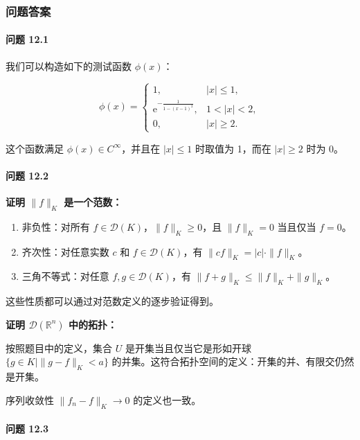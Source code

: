 \subsubsection{问题答案}\label{ux95eeux9898ux7b54ux6848}

\paragraph{问题 12.1}\label{ux95eeux9898-12.1}

我们可以构造如下的测试函数 \(\phi(x)\)：

\[
\phi(x) =
\begin{cases}
1, & |x| \leq 1, \\
\mathrm{e}^{-\frac{1}{1 - (x - 1)^2}}, & 1 < |x| < 2, \\
0, & |x| \geq 2.
\end{cases}
\]

这个函数满足 \(\phi(x) \in C^\infty\)，并且在 \(|x| \leq 1\) 时取值为
1，而在 \(|x| \geq 2\) 时为 0。

\paragraph{问题 12.2}\label{ux95eeux9898-12.2}

\textbf{证明 \(\|f\|_K\) 是一个范数：}

\begin{enumerate}

\item
  非负性：对所有 \(f \in \mathcal{D}(K)\)，\(\|f\|_K \geq 0\)，且
  \(\|f\|_K = 0\) 当且仅当 \(f = 0\)。
\item
  齐次性：对任意实数 \(c\) 和 \(f \in \mathcal{D}(K)\)，有
  \(\|cf\|_K = |c| \cdot \|f\|_K\)。
\item
  三角不等式：对任意 \(f, g \in \mathcal{D}(K)\)，有
  \(\|f + g\|_K \leq \|f\|_K + \|g\|_K\)。
\end{enumerate}

这些性质都可以通过对范数定义的逐步验证得到。

\textbf{证明 \(\mathcal{D}(\mathbb{R}^n)\) 中的拓扑：}

按照题目中的定义，集合 \(U\) 是开集当且仅当它是形如开球
\(\{g \in K \mid \|g - f\|_K < a\}\)
的并集。这符合拓扑空间的定义：开集的并、有限交仍然是开集。

序列收敛性 \(\|f_n - f\|_K \to 0\) 的定义也一致。

\paragraph{问题 12.3}\label{ux95eeux9898-12.3}

